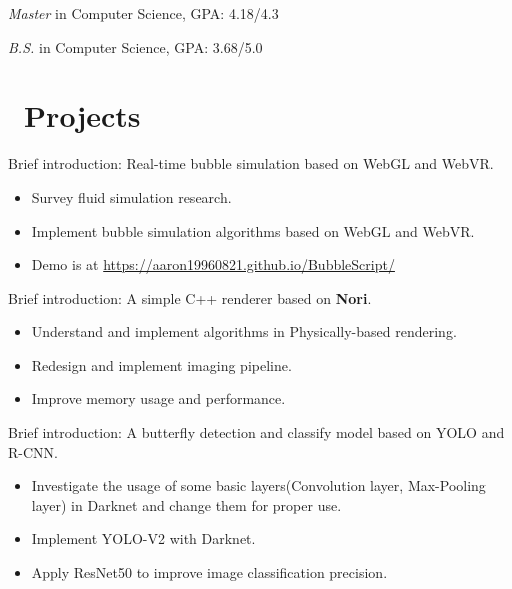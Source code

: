 \documentclass{resume}
\begin{document}



\textit{Master} in Computer Science, GPA: 4.18/4.3

\textit{B.S.} in Computer Science, GPA: 3.68/5.0

\section{\faUsers\ Projects}

Brief introduction: Real-time bubble simulation based on WebGL and WebVR.
\begin{itemize}
    \item Survey fluid simulation research.
    \item Implement bubble simulation algorithms based on WebGL and WebVR.
    \item Demo is at \url{https://aaron19960821.github.io/BubbleScript/}
\end{itemize}

Brief introduction: A simple C++ renderer based on \textbf{Nori}.
\begin{itemize}
    \item Understand and implement algorithms in Physically-based rendering.
    \item Redesign and implement imaging pipeline.
    \item Improve memory usage and performance.
\end{itemize}

Brief introduction: A butterfly detection and classify model based on YOLO and R-CNN.
\begin{itemize}
	\item Investigate the usage of some basic layers(Convolution layer, Max-Pooling layer) in Darknet and change them for proper use.
  \item Implement YOLO-V2 with Darknet.
	\item Apply ResNet50 to improve image classification precision.
\end{itemize}
\end{document}
